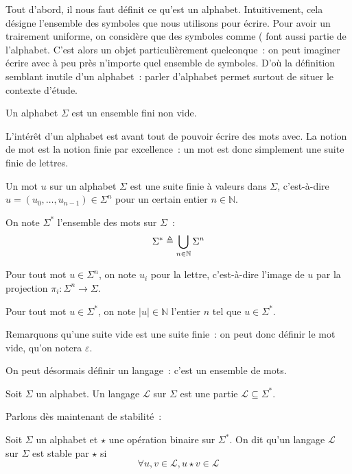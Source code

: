 Tout d'abord, il nous faut définit ce qu'est un alphabet. Intuitivement, cela
désigne l'ensemble des symboles que nous utilisons pour écrire. Pour avoir un
trairement uniforme, on considère que des symboles comme \og ( \fg font aussi
partie de l'alphabet. C'est alors un objet particulièrement quelconque~: on peut
imaginer écrire avec à peu près n'importe quel ensemble de symboles. D'où la
définition semblant inutile d'un alphabet~: parler d'alphabet permet surtout de
situer le contexte d'étude.

\begin{definition}[Alphabet]
  Un alphabet $\Sigma$ est un ensemble fini non vide.
\end{definition}

L'intérêt d'un alphabet est avant tout de pouvoir écrire des mots avec. La
notion de mot est la notion finie par excellence~: un mot est donc simplement
une suite finie de lettres.

\begin{definition}[Mot]
  Un mot $u$ sur un alphabet $\Sigma$ est une suite finie à valeurs dans
  $\Sigma$, c'est-à-dire
  $u = (u_0,\ldots,u_{n-1})\in \Sigma^n$ pour un certain entier $n\in\mathbb N$.

  On note $\Sigma^*$ l'ensemble des mots sur $\Sigma$~:
  \[\Sigma^* \triangleq \bigcup_{n\in \mathbb N} \Sigma^n\]
\end{definition}

\begin{notation}
  Pour tout mot $u\in\Sigma^n$, on note $u_i$ pour la
   lettre, c'est-à-dire l'image de $u$ par la
  projection $\pi_i : \Sigma^n \to \Sigma$.

  Pour tout mot $u\in\Sigma^*$, on note $|u|\in\mathbb N$ l'entier $n$ tel que
  $u\in \Sigma^*$.
\end{notation}

Remarquons qu'une suite vide est une suite finie~: on peut donc définir le mot
vide, qu'on notera $\varepsilon$.

On peut désormais définir un langage~: c'est un ensemble de mots.

\begin{definition}[Langage]
  Soit $\Sigma$ un alphabet. Un langage $\mathcal L$ sur $\Sigma$ est une partie
  $\mathcal L\subseteq\Sigma^*$.
\end{definition}

Parlons dès maintenant de stabilité~:

\begin{definition}[Stabilité]
  Soit $\Sigma$ un alphabet et $\star$ une opération binaire sur $\Sigma^*$. On
  dit qu'un langage $\mathcal L$ sur $\Sigma$ est stable par $\star$ si
  \[\forall u,v\in \mathcal L, u\star v \in \mathcal L\]
\end{definition}

